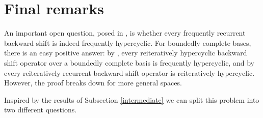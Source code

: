\documentclass[11pt]{amsart}
\newcommand{\zK}{\mathbb K}
\begin{document}




\section{Final remarks}

An important open question, posed in \cite{BonGroLopPer22JFA}, is whether every frequently recurrent backward shift is indeed frequently hypercyclic. For boundedly complete bases, there is an easy positive answer: by \cite{charpentier2019chaos}, every reiteratively hypercyclic backward shift operator over a boundedly complete basis is frequently hypercyclic, and by \cite{CardeMurBlock} every reiteratively recurrent backward shift operator is reiteratively hypercyclic. However, the proof breaks down for more general spaces. 

Inspired by the results of Subsection \ref{intermediate} we can split this problem into two different questions.
\end{document}
